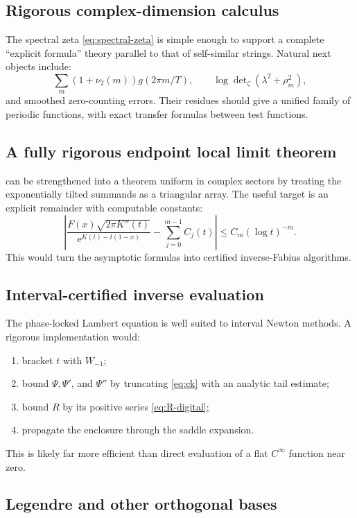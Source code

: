 \documentclass[11pt,oneside]{article}
\theoremstyle{definition}
\theoremstyle{remark}
\newcommand{\e}{\mathrm e}
\begin{document}
\subsection{Rigorous complex-dimension calculus}

The spectral zeta \eqref{eq:spectral-zeta} is simple enough to support a
complete ``explicit formula'' theory parallel to that of self-similar
strings.  Natural next objects include:
\[
 \sum_m(1+\nu_2(m))g(2\pi m/T),
 \qquad
 \log\det\nolimits_\zeta(\lambda^2+\rho_m^2),
\]
and smoothed zero-counting errors.  Their residues should give a unified
family of periodic functions, with exact transfer formulas between test
functions.

\subsection{A fully rigorous endpoint local limit theorem}

 can be strengthened into a theorem uniform in
complex sectors by treating the exponentially tilted summands as a triangular
array.  The useful target is an explicit remainder with computable constants:
\[
 \left|
 \frac{F(x)\sqrt{2\pi K''(t)}}
      {\e^{K(t)-t(1-x)}}
 -\sum_{j=0}^{m-1}C_j(t)
 \right|
 \leq C_m(\log t)^{-m}.
\]
This would turn the asymptotic formulas into certified inverse-Fabius
algorithms.

\subsection{Interval-certified inverse evaluation}

The phase-locked Lambert equation is well suited to interval Newton methods.
A rigorous implementation would:
\begin{enumerate}[label=\arabic*.,leftmargin=2em]
\item bracket \(t\) with \(W_{-1}\);
\item bound \(\Psi,\Psi'\), and \(\Psi''\) by truncating
      \eqref{eq:ck} with an analytic tail estimate;
\item bound \(R\) by its positive series \eqref{eq:R-digital};
\item propagate the enclosure through the saddle expansion.
\end{enumerate}
This is likely far more efficient than direct evaluation of a flat
\(C^\infty\) function near zero.

\subsection{Legendre and other orthogonal bases}
\end{document}
